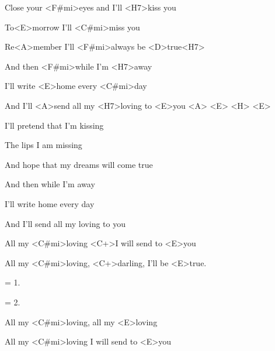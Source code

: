 

\zs
Close your <F#mi>eyes and I'll <H7>kiss you

To<E>morrow I'll <C#mi>miss you

Re<A>member I'll <F#mi>always be <D>true<H7>

And then <F#mi>while I'm <H7>away

I'll write <E>home every <C#mi>day

And I'll <A>send all my <H7>loving to <E>you <A> <E> <H> <E>
\ks

\zs
I'll pretend that I'm kissing

The lips I am missing

And hope that my dreams will come true

And then while I'm away

I'll write home every day

And I'll send all my loving to you
\ks

\zr
All my <C#mi>loving <C+>I will send to <E>you

All my <C#mi>loving, <C+>darling, I'll be <E>true.
\kr

\zs
= 1.
\ks

\zs
= 2.
\ks

\zr
All my <C#mi>loving, all my <E>loving

All my <C#mi>loving I will send to <E>you
\kr

\kp
